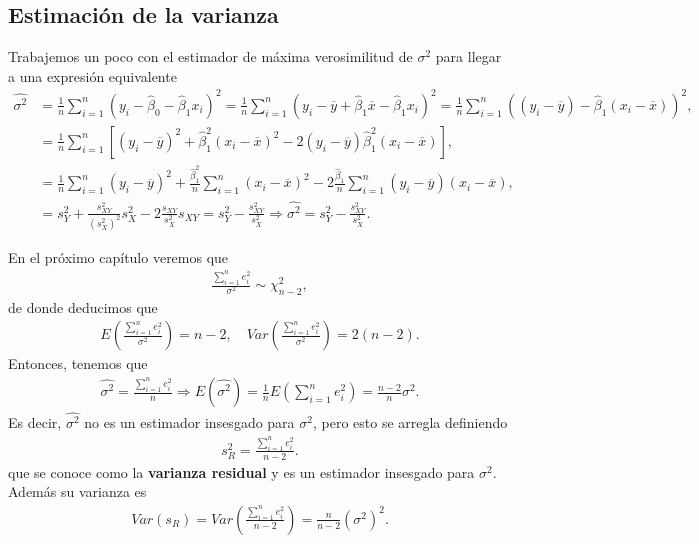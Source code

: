 \subsection{Estimación de la varianza}
\noindent Trabajemos un poco con el estimador de máxima verosimilitud de $\sigma^2$ para llegar a una expresión equivalente
\begin{align*}
    \widehat{\sigma^2} &= \frac{1}{n} \sum_{i=1}^{n} (y_i - \widehat{\beta}_0 - \widehat{\beta}_1 x_i)^2 = \frac{1}{n} \sum_{i=1}^{n} (y_i - \overline{y} + \widehat{\beta}_1 \overline{x} - \widehat{\beta}_1 x_i)^2  = \frac{1}{n} \sum_{i=1}^{n}((y_i - \overline{y}) - \widehat{\beta}_1(x_i - \overline{x}))^2, \\
    &= \frac{1}{n} \sum_{i=1}^{n}[(y_i - \overline{y})^2 + \widehat{\beta}_1^2(x_i - \overline{x})^2 - 2(y_i - \overline{y})\widehat{\beta}_1^2(x_i - \overline{x})], \\
    &= \frac{1}{n} \sum_{i=1}^{n}(y_i - \overline{y})^2 + \frac{\widehat{\beta}_1^2}{n} \sum_{i=1}^{n} (x_i-\overline{x})^2 - 2\frac{\widehat{\beta}_1}{n} \sum_{i=1}^{n} (y_i - \overline{y})(x_i-\overline{x}), \\
    &= s_Y^2 + \frac{s_{XY}^2}{(s_X^2)^2}s_X^2 - 2\frac{s_{XY}}{s_X^2} s_{XY} = s_Y^2 - \frac{s_{XY}^2}{s_X^2} \Longrightarrow \boxed{ 
    \widehat{\sigma^2} = s_Y^2 - \frac{s_{XY}^2}{s_X^2}.
    }
\end{align*}
\begin{obs}
    En el próximo capítulo veremos que
    \begin{align*}
        \frac{\sum_{i=1}^{n} e_i^2}{\sigma^2} \sim \chi_{n-2}^2,
    \end{align*}
    de donde deducimos que
    \begin{align*}
        E \left( \frac{\sum_{i=1}^{n} e_i^2}{\sigma^2} \right) = n-2, \quad Var\left( \frac{\sum_{i=1}^{n} e_i^2}{\sigma^2} \right) = 2(n-2).
    \end{align*}
    Entonces, tenemos que 
    \begin{align*}
        \widehat{\sigma^2} = \frac{\sum_{i=1}^{n} e_i^2}{n} \Longrightarrow E\left( \widehat{\sigma^2}\right) = \frac{1}{n}E\left( \sum_{i=1}^{n} e_i^2\right) = \frac{n-2}{n}\sigma^2.
    \end{align*}
    Es decir, $\widehat{\sigma^2}$ no es un estimador insesgado para $\sigma^2$, pero esto se arregla definiendo
    \begin{align*}
        \boxed{
        s_R^2 = \frac{\sum_{i=1}^{n} e_i^2}{n-2}.
        }
    \end{align*}
    que se conoce como la \textbf{varianza residual} y es un estimador insesgado para $\sigma^2$. Además su varianza es
    \begin{align*}
        Var(s_R) = Var\left( \frac{\sum_{i=1}^{n} e_i^2}{n-2} \right) = \frac{n}{n-2} \left(\sigma^2\right)^2.
    \end{align*}
\end{obs}

